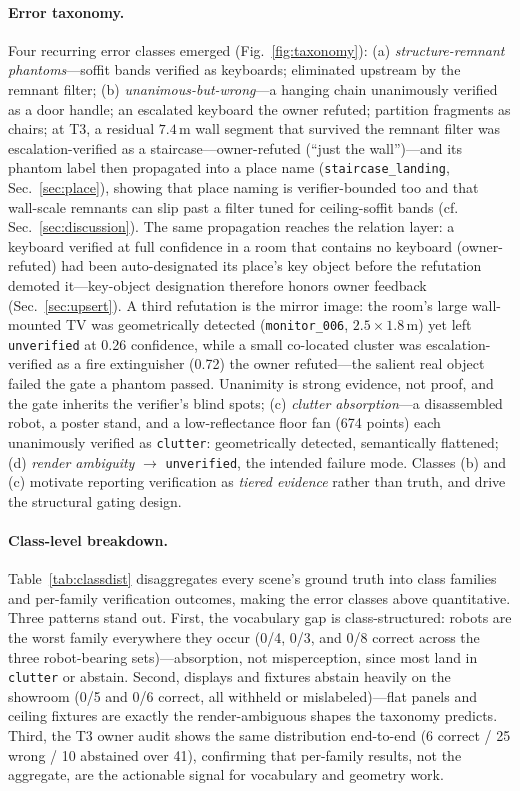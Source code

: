 \paragraph{Error taxonomy.}
Four recurring error classes emerged (Fig.~\ref{fig:taxonomy}):
(a) \emph{structure-remnant phantoms}---soffit bands verified as keyboards;
eliminated upstream by the remnant filter;
(b) \emph{unanimous-but-wrong}---a hanging chain unanimously verified as a
door handle; an escalated keyboard the owner refuted; partition fragments as
chairs; at T3, a residual $7.4$\,m wall segment that survived the remnant
filter was escalation-verified as a staircase---owner-refuted (``just the
wall'')---and its phantom label then propagated into a place name
(\texttt{staircase\_landing}, Sec.~\ref{sec:place}), showing that place
naming is verifier-bounded too and that wall-scale remnants can slip past a
filter tuned for ceiling-soffit bands (cf. Sec.~\ref{sec:discussion}).
The same propagation reaches the relation layer: a keyboard verified at
full confidence in a room that contains no keyboard (owner-refuted) had
been auto-designated its place's key object before the refutation demoted
it---key-object designation therefore honors owner feedback
(Sec.~\ref{sec:upsert}). A third refutation is the mirror image: the
room's large wall-mounted TV was geometrically detected
(\texttt{monitor\_006}, $2.5\times1.8$\,m) yet left \texttt{unverified}
at 0.26 confidence, while a small co-located cluster was
escalation-verified as a fire extinguisher (0.72) the owner refuted---the
salient real object failed the gate a phantom passed.
Unanimity is strong evidence, not proof, and the gate inherits the
verifier's blind spots;
(c) \emph{clutter absorption}---a disassembled robot, a poster stand, and a
low-reflectance floor fan (674 points) each unanimously verified as
\texttt{clutter}: geometrically detected, semantically flattened;
(d) \emph{render ambiguity} $\rightarrow$ \texttt{unverified}, the intended
failure mode.
Classes (b) and (c) motivate reporting verification as \emph{tiered
evidence} rather than truth, and drive the structural gating design.

\paragraph{Class-level breakdown.}
Table~\ref{tab:classdist} disaggregates every scene's ground truth into
class families and per-family verification outcomes, making the error
classes above quantitative. Three patterns stand out. First, the
vocabulary gap is class-structured: robots are the worst family
everywhere they occur (0/4, 0/3, and 0/8 correct across the three
robot-bearing sets)---absorption, not misperception, since most land in
\texttt{clutter} or abstain. Second, displays and fixtures abstain
heavily on the showroom (0/5 and 0/6 correct, all withheld or
mislabeled)---flat panels and ceiling fixtures are exactly the
render-ambiguous shapes the taxonomy predicts. Third, the T3 owner audit
shows the same distribution end-to-end (6 correct / 25 wrong / 10
abstained over 41), confirming that per-family results, not the
aggregate, are the actionable signal for vocabulary and geometry work.

